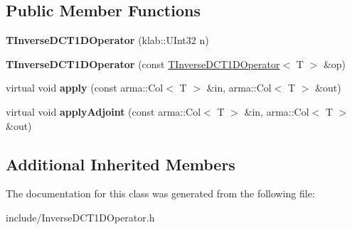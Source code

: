 \subsection*{Public Member Functions}
\begin{DoxyCompactItemize}
\item 
{\bfseries T\+Inverse\+D\+C\+T1\+D\+Operator} (klab\+::\+U\+Int32 n)\hypertarget{classkl1p_1_1TInverseDCT1DOperator_afa81febe834685376d6d7c043a1faf08}{}\label{classkl1p_1_1TInverseDCT1DOperator_afa81febe834685376d6d7c043a1faf08}

\item 
{\bfseries T\+Inverse\+D\+C\+T1\+D\+Operator} (const \hyperlink{classkl1p_1_1TInverseDCT1DOperator}{T\+Inverse\+D\+C\+T1\+D\+Operator}$<$ T $>$ \&op)\hypertarget{classkl1p_1_1TInverseDCT1DOperator_aaadd54b7ea9f6e36e18317fbf7e1dc72}{}\label{classkl1p_1_1TInverseDCT1DOperator_aaadd54b7ea9f6e36e18317fbf7e1dc72}

\item 
virtual void {\bfseries apply} (const arma\+::\+Col$<$ T $>$ \&in, arma\+::\+Col$<$ T $>$ \&out)\hypertarget{classkl1p_1_1TInverseDCT1DOperator_a06a902a7a249649d0a1a253c3528822e}{}\label{classkl1p_1_1TInverseDCT1DOperator_a06a902a7a249649d0a1a253c3528822e}

\item 
virtual void {\bfseries apply\+Adjoint} (const arma\+::\+Col$<$ T $>$ \&in, arma\+::\+Col$<$ T $>$ \&out)\hypertarget{classkl1p_1_1TInverseDCT1DOperator_af6f98150c3844a749a326b57367c1e45}{}\label{classkl1p_1_1TInverseDCT1DOperator_af6f98150c3844a749a326b57367c1e45}

\end{DoxyCompactItemize}
\subsection*{Additional Inherited Members}


The documentation for this class was generated from the following file\+:\begin{DoxyCompactItemize}
\item 
include/Inverse\+D\+C\+T1\+D\+Operator.\+h\end{DoxyCompactItemize}
